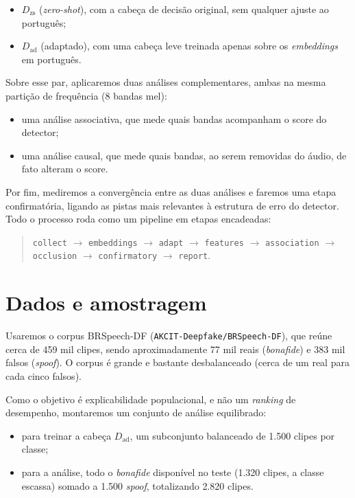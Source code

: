 \documentclass[11pt,a4paper]{article}
\begin{document}
\begin{itemize}
  \item $D_{\mathrm{zs}}$ (\emph{zero-shot}), com a cabeça de decisão original,
        sem qualquer ajuste ao português;
  \item $D_{\mathrm{ad}}$ (adaptado), com uma cabeça leve treinada apenas sobre os
        \emph{embeddings} em português.
\end{itemize}

Sobre esse par, aplicaremos duas análises complementares, ambas na mesma partição
de frequência (8 bandas mel):

\begin{itemize}
  \item uma análise associativa, que mede quais bandas acompanham o score do
        detector;
  \item uma análise causal, que mede quais bandas, ao serem removidas do áudio, de
        fato alteram o score.
\end{itemize}

Por fim, mediremos a convergência entre as duas análises e faremos uma etapa
confirmatória, ligando as pistas mais relevantes à estrutura de erro do detector.
Todo o processo roda como um pipeline em etapas encadeadas:

\begin{quote}
\texttt{collect} $\rightarrow$ \texttt{embeddings} $\rightarrow$ \texttt{adapt}
$\rightarrow$ \texttt{features} $\rightarrow$ \texttt{association} $\rightarrow$
\texttt{occlusion} $\rightarrow$ \texttt{confirmatory} $\rightarrow$ \texttt{report}.
\end{quote}

\section{Dados e amostragem}

Usaremos o corpus BRSpeech-DF (\texttt{AKCIT-Deepfake/BRSpeech-DF}), que reúne
cerca de 459 mil clipes, sendo aproximadamente 77 mil reais (\emph{bonafide}) e
383 mil falsos (\emph{spoof}). O corpus é grande e bastante desbalanceado (cerca
de um real para cada cinco falsos).

Como o objetivo é explicabilidade populacional, e não um \emph{ranking} de
desempenho, montaremos um conjunto de análise equilibrado:

\begin{itemize}
  \item para treinar a cabeça $D_{\mathrm{ad}}$, um subconjunto balanceado de
        1.500 clipes por classe;
  \item para a análise, todo o \emph{bonafide} disponível no teste (1.320 clipes,
        a classe escassa) somado a 1.500 \emph{spoof}, totalizando 2.820 clipes.
\end{itemize}
\end{document}
